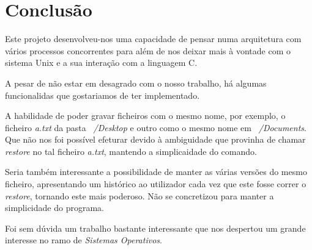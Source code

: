 \documentclass[12pt,a4paper]{report}
\begin{document}
\chapter{Conclusão}
Este projeto desenvolveu-nos uma capacidade de pensar numa arquitetura com vários processos concorrentes  para além de nos deixar mais à vontade com o sistema Unix e a sua interação com a linguagem C.\par
A pesar de não estar em desagrado com o nosso trabalho, há algumas funcionalidas que gostariamos de ter implementado.\par
A habilidade de poder gravar ficheiros com o mesmo nome, por exemplo, o ficheiro \emph{a.txt} da pasta \emph{~/Desktop} e outro como o mesmo nome em \emph{~/Documents}. Que não nos foi possível efeturar devido à ambiguidade que provinha de chamar \emph{restore} no tal ficheiro \emph{a.txt}, mantendo a simplicaidade do comando.\par
Seria também interessante a possibilidade de manter as várias versões do mesmo ficheiro, apresentando um histórico ao utilizador cada vez que este fosse correr o \emph{restore}, tornando este mais poderoso. Não se concretizou para manter a simplicidade do programa.\par
Foi sem dúvida um trabalho bastante interessante que nos despertou um grande interesse no ramo de \emph{Sistemas Operativos}.
\end{document}
